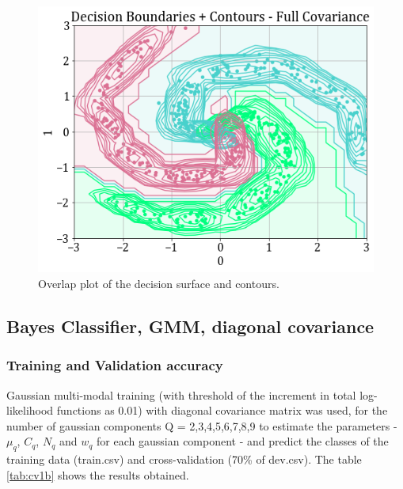 \documentclass[11pt,a4paper]{article}
\begin{document}
\vspace{-1em}
\begin{figure}[H]
    \centering
    \includegraphics[scale=0.45]{images/1B/1b_full_ds_contours.png}
    \caption{Overlap plot of the decision surface and contours.}
\end{figure}

\subsection{Bayes Classifier, GMM, diagonal covariance}
\subsubsection{Training and Validation accuracy}
Gaussian multi-modal training (with threshold of the increment in total log-likelihood functions as 0.01) with diagonal covariance matrix was used, for the number of gaussian components Q = {2,3,4,5,6,7,8,9} to estimate the parameters - $\mu_q$, $C_q$, $N_q$ and $w_q$ for each gaussian component - and predict the classes of the training data (train.csv) and cross-validation (70\% of dev.csv). The table \ref{tab:cv1b} shows the results obtained.

\end{document}

